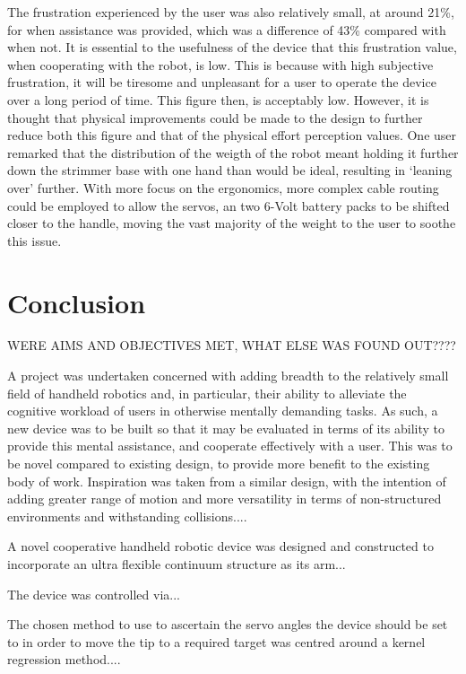 \documentclass[11pt]{article}
\begin{document}
The frustration experienced by the user was also relatively small, at around 21\%, for when assistance was provided, which was a difference of 43\% compared with when not. It is essential to the usefulness of the device that this frustration value, when cooperating with the robot, is low. This is because with high subjective frustration, it will be tiresome and unpleasant for a user to operate the device over a long period of time. This figure then, is acceptably low. However, it is thought that physical improvements could be made to the design to further reduce both this figure and that of the physical effort perception values. One user remarked that the distribution of the weigth of the robot meant holding it further down the strimmer base with one hand than would be ideal, resulting in `leaning over' further. With more focus on the ergonomics, more complex cable routing could be employed to allow the servos, an two 6-Volt battery packs to be shifted closer to the handle, moving the vast majority of the weight to the user to soothe this issue.

 


\section{Conclusion}
WERE AIMS AND OBJECTIVES MET, WHAT ELSE WAS FOUND OUT????

A project was undertaken concerned with adding breadth to the relatively small field of handheld robotics and, in particular, their ability to alleviate the cognitive workload of users in otherwise mentally demanding tasks. As such, a new device was to be built so that it may be evaluated in terms of its ability to provide this mental assistance, and cooperate effectively with a user. This was to be novel compared to existing design, to provide more benefit to the existing body of work. Inspiration was taken from a similar design, with the intention of adding greater range of motion and more versatility in terms of non-structured environments and withstanding collisions....

A novel cooperative handheld robotic device was designed and constructed to incorporate an ultra flexible continuum structure as its arm...

The device was controlled via...

The chosen method to use to ascertain the servo angles the device should be set to in order to move the tip to a required target was centred around a kernel regression method....
\end{document}
